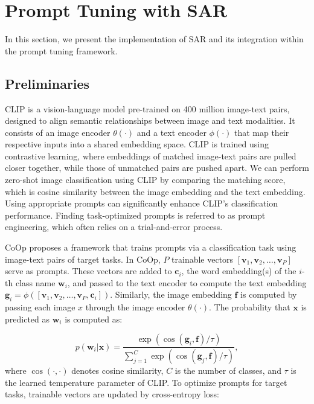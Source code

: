 \section{Prompt Tuning with SAR}
In this section, we present the implementation of SAR and its integration within the prompt tuning framework.

\subsection{Preliminaries}
 CLIP is a vision-language model pre-trained on 400 million image-text pairs, designed to align semantic relationships between image and text modalities. It consists of an image encoder $\theta(\cdot)$ and a text encoder $\phi(\cdot)$ that map their respective inputs into a shared embedding space. CLIP is trained using contrastive learning, where embeddings of matched image-text pairs are pulled closer together, while those of unmatched pairs are pushed apart. We can perform zero-shot image classification using CLIP by comparing the matching score, which is cosine similarity between the image embedding and the text embedding. Using appropriate prompts can significantly enhance CLIP’s classification performance. Finding task-optimized prompts is referred to as prompt engineering, which often relies on a trial-and-error process.

 CoOp \cite{zhou2022learning} proposes a framework that trains prompts via a classification task using image-text pairs of target tasks. In CoOp, $P$ trainable vectors $[\boldsymbol{v}_1, \boldsymbol{v}_2, \dots, \boldsymbol{v}_P]$ serve as prompts. These vectors are added to $\boldsymbol{c}_i$, the word embedding(s) of the $i$-th class name $\boldsymbol{w}_i$, and passed to the text encoder to compute the text embedding $\boldsymbol{g}_i = \phi([\boldsymbol{v}_1, \boldsymbol{v}_2, \dots, \boldsymbol{v}_P, \boldsymbol{c}_i])$. Similarly, the image embedding $\boldsymbol{f}$ is computed by passing each image $x$ through the image encoder $\theta(\cdot)$. The probability that $\boldsymbol{x}$ is predicted as $\boldsymbol{w}_i$ is computed as:

\begin{equation}
p(\boldsymbol{w}_i|\boldsymbol{x}) = \frac{\exp(\cos(\boldsymbol{g}_i,\boldsymbol{f}) / \tau)}{\sum_{j=1}^C \exp(\cos(\boldsymbol{g}_j,\boldsymbol{f}) / \tau)},
\end{equation}
where $\cos(\cdot, \cdot)$ denotes cosine similarity, $C$ is the number of classes, and $\tau$ is the learned temperature parameter of CLIP. To optimize prompts for target tasks, trainable vectors are updated by cross-entropy loss:

